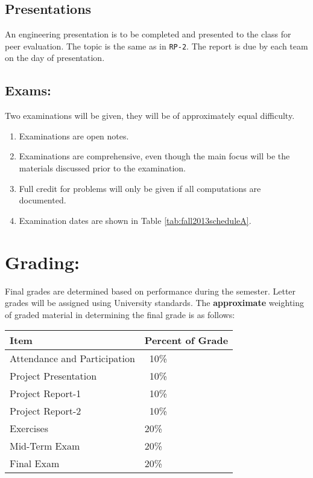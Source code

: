 \documentclass[12pt]{article}
\begin{document}
\subsection*{Presentations}
An engineering presentation is to be completed and presented to the class for peer evaluation. 
The topic is the same as in \texttt{RP-2}.   The report is due by each team on the day of presentation.

\subsection*{Exams:} Two examinations will be given, they will be of approximately equal difficulty.
\begin{enumerate}
\item Examinations are open notes.
\item Examinations are comprehensive, even though the main focus will be the materials discussed prior to the examination.
\item Full credit for problems will only be given if all computations are documented.
\item Examination dates are shown in Table \ref{tab:fall2013scheduleA}.
\end{enumerate}
\newpage

\section*{Grading:} Final grades are determined based on performance during the semester.  Letter grades will be assigned using University standards.  The \textbf{approximate} weighting of graded material in determining the final grade is as follows:
\begin{center}
\begin{table}[h!]
   \begin{tabular}{l l}
Item & Percent of Grade \\
\hline
\hline
Attendance and Participation & ~10\% \\
Project Presentation & ~10\% \\
Project Report-1 & ~10\% \\
Project Report-2 & ~10\% \\
Exercises & 20\% \\
Mid-Term Exam & 20\% \\
Final Exam & 20\% \\
\hline
\end{tabular}
\end{table}
\end{center}
\clearpage
\end{document}
